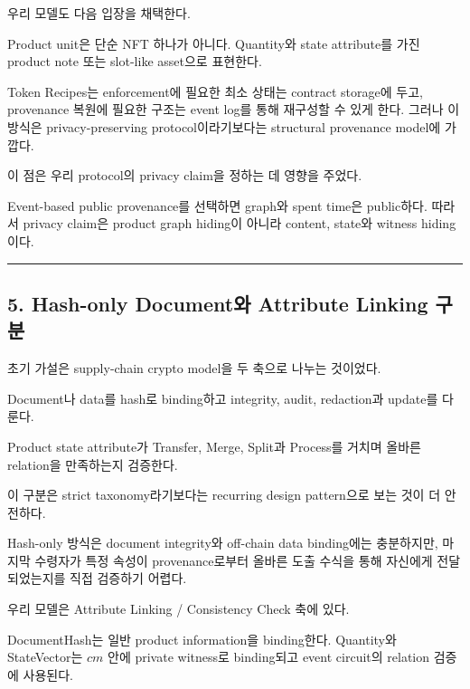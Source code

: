 \documentclass[11pt]{extarticle}
\begin{document}
우리 모델도 다음 입장을 채택한다.

Product unit은 단순 NFT 하나가 아니다. Quantity와 state attribute를 가진 product
note 또는 slot-like asset으로 표현한다.

Token Recipes는 enforcement에 필요한 최소 상태는 contract storage에
두고, provenance 복원에 필요한 구조는 event log를 통해 재구성할 수 있게
한다. 그러나 이 방식은 privacy-preserving protocol이라기보다는
structural provenance model에 가깝다.

이 점은 우리 protocol의 privacy claim을 정하는 데 영향을 주었다.

Event-based public provenance를 선택하면 graph와 spent time은 public하다. 따라서
privacy claim은 product graph hiding이 아니라 content, state와 witness hiding이다.

\begin{center}\rule{0.5\linewidth}{0.5pt}\end{center}

\subsection{5. Hash-only Document와 Attribute Linking
구분}\label{5-hash-only-documentuxc640-attribute-linking-uxad6cuxbd84}

초기 가설은 supply-chain crypto model을 두 축으로 나누는 것이었다.

\begin{description}[leftmargin=45mm,style=nextline]
  \item[Hash-Based Document] Document나 data를 hash로 binding하고 integrity, audit,
  redaction과 update를 다룬다.
  \item[Attribute Linking / Consistency Check] Product state attribute가 Transfer,
  Merge, Split과 Process를 거치며 올바른 relation을 만족하는지 검증한다.
\end{description}

이 구분은 strict taxonomy라기보다는 recurring design pattern으로 보는
것이 더 안전하다.

Hash-only 방식은 document integrity와 off-chain data binding에는
충분하지만, 마지막 수령자가 특정 속성이 provenance로부터 올바른 도출
수식을 통해 자신에게 전달되었는지를 직접 검증하기 어렵다.

우리 모델은 Attribute Linking / Consistency Check 축에 있다.

DocumentHash는 일반 product information을 binding한다. Quantity와 StateVector는
$cm$ 안에 private witness로 binding되고 event circuit의 relation 검증에 사용된다.
\end{document}
